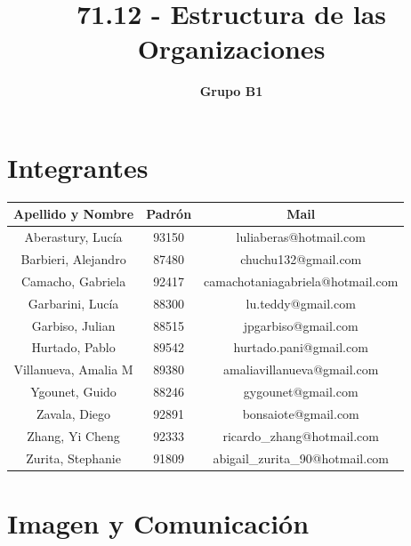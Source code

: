 \documentclass[a4paper,10pt,titlepage]{article}
\title{71.12 - Estructura de las Organizaciones}
\author{\textbf{Grupo B1}}
\begin{document}
\pagestyle{fancy}
\maketitle

\tableofcontents
\newpage


\section{Integrantes}
\begin{center}
  \begin{tabular}{ | c | c | c | }
    \hline 
      \textbf{Apellido y Nombre} & \textbf{Padr\'on} & \textbf{Mail} \\ \hline
      Aberastury, Luc\'ia & 93150 & luliaberas@hotmail.com \\ \hline
      Barbieri, Alejandro & 87480 & chuchu132@gmail.com \\ \hline
      Camacho, Gabriela & 92417 & camachotaniagabriela@hotmail.com  \\ \hline
      Garbarini, Luc\'ia & 88300 & lu.teddy@gmail.com \\ \hline
      Garbiso, Julian & 88515 & jpgarbiso@gmail.com \\ \hline
      Hurtado, Pablo & 89542 & hurtado.pani@gmail.com \\ \hline
      Villanueva, Amalia M & 89380 & amaliavillanueva@gmail.com \\ \hline
      Ygounet, Guido & 88246 & gygounet@gmail.com \\ \hline
      Zavala, Diego & 92891 & bonsaiote@gmail.com  \\ \hline
      Zhang, Yi Cheng & 92333 & ricardo\_zhang@hotmail.com \\ \hline
      Zurita, Stephanie & 91809 & abigail\_zurita\_90@hotmail.com \\
    \hline
  \end{tabular}
\end{center}
\newpage

\section{Imagen y Comunicaci\'on}
\end{document}
